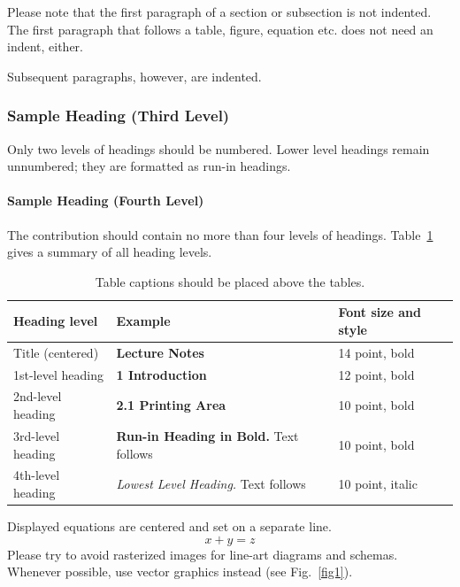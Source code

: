 \documentclass[runningheads]{llncs}
\begin{document}
    Please note that the first paragraph of a section or subsection is
    not indented.
    The first paragraph that follows a table, figure,
    equation etc. does not need an indent, either.

    Subsequent paragraphs, however, are indented.

    \subsubsection{Sample Heading (Third Level)} Only two levels of
    headings should be numbered. Lower level headings remain unnumbered;
    they are formatted as run-in headings.

    \paragraph{Sample Heading (Fourth Level)}
    The contribution should contain no more than four levels of
    headings. Table~\ref{tab1} gives a summary of all heading levels.

    \begin{table}
        \caption{Table captions should be placed above the
        tables.}\label{tab1}
        \begin{tabular}{|l|l|l|}
            \hline
            Heading level     & Example                                          & Font size and style \\
            \hline
            Title (centered)  & {\Large\bfseries Lecture Notes}                  & 14 point, bold      \\
            1st-level heading & {\large\bfseries 1 Introduction}                 & 12 point, bold      \\
            2nd-level heading & {\bfseries 2.1 Printing Area}                    & 10 point, bold      \\
            3rd-level heading & {\bfseries Run-in Heading in Bold.} Text follows & 10 point, bold      \\
            4th-level heading & {\itshape Lowest Level Heading.} Text follows    & 10 point, italic    \\
            \hline
        \end{tabular}
    \end{table}


    \noindent Displayed equations are centered and set on a separate
    line.
    \begin{equation}
        x + y = z
    \end{equation}
    Please try to avoid rasterized images for line-art diagrams and
    schemas. Whenever possible, use vector graphics instead (see
    Fig.~\ref{fig1}).
\end{document}
